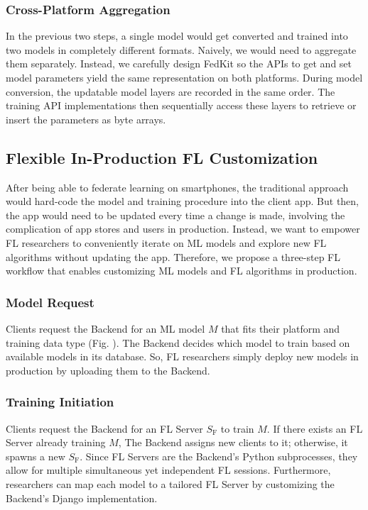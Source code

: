 \documentclass[letterpaper]{article} %
\begin{document}
\subsubsection{Cross-Platform Aggregation}
In the previous two steps,
a single model would get converted and trained into two models in
completely different formats.
Naively, we would need to aggregate them separately.
Instead, we carefully design FedKit so the APIs to get and set model parameters
yield the same representation on both platforms.
During model conversion,
the updatable model layers are recorded in the same order.
The training API implementations then sequentially access these layers to
retrieve or insert the parameters as byte arrays.

\subsection{Flexible In-Production FL Customization}
\newcommand{\model}{$M$}
\newcommand{\fs}{$S_\mathrm F$}
After being able to federate learning on smartphones,
the traditional approach would hard-code the model and training procedure
into the client app.
But then, the app would need to be updated every time a change is made,
involving the complication of app stores and users in production.
Instead,
we want to empower FL researchers to conveniently iterate on ML models and
explore new FL algorithms
without updating the app.
Therefore, we propose a three-step FL workflow that
enables customizing ML models and FL algorithms in production.

\subsubsection{Model Request}
Clients request the Backend for an ML model \model{} that fits
their platform and training data type (Fig. ). %
The Backend decides which model to train based on
available models in its database.
So, FL researchers simply deploy new models in production by uploading them to
the Backend.

\subsubsection{Training Initiation}
Clients request the Backend for an FL Server \fs{} to train \model.
If there exists an FL Server already training \model,
The Backend assigns new clients to it;
otherwise, it spawns a new \fs.
Since FL Servers are the Backend's Python subprocesses,
they allow for multiple simultaneous yet independent FL sessions.
Furthermore, researchers can map each model to a tailored FL Server by
customizing the Backend's Django implementation.
\end{document}
